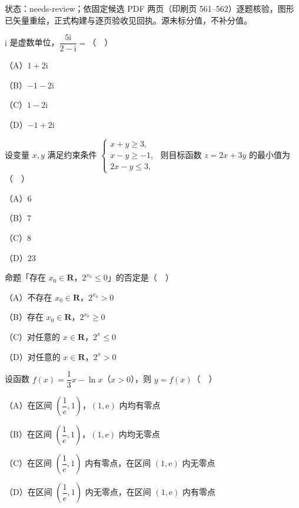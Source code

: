 

状态：needs-review；依固定候选 PDF 两页（印刷页 561–562）逐题核验，图形已矢量重绘，正式构建与逐页验收见回执。源未标分值，不补分值。


\begin{question}
$\mathrm i$ 是虚数单位，$\dfrac{5\mathrm i}{2-\mathrm i}=$（　）

（A）$1+2\mathrm i$

（B）$-1-2\mathrm i$

（C）$1-2\mathrm i$

（D）$-1+2\mathrm i$

\end{question}
\begin{question}
设变量 $x,y$ 满足约束条件 $\begin{cases}x+y\geqslant3,\\ x-y\geqslant-1,\\ 2x-y\leqslant3,\end{cases}$ 则目标函数 $z=2x+3y$ 的最小值为（　）

（A）$6$

（B）$7$

（C）$8$

（D）$23$

\end{question}
\begin{question}
命题「存在 $x_0\in\mathbf R$，$2^{x_0}\leqslant0$」的否定是（　）

（A）不存在 $x_0\in\mathbf R$，$2^{x_0}>0$

（B）存在 $x_0\in\mathbf R$，$2^{x_0}\geqslant0$

（C）对任意的 $x\in\mathbf R$，$2^x\leqslant0$

（D）对任意的 $x\in\mathbf R$，$2^x>0$

\end{question}
\begin{question}
设函数 $f(x)=\dfrac13x-\ln x$（$x>0$），则 $y=f(x)$（　）

（A）在区间 $\left(\dfrac1e,1\right)$，$(1,\mathrm e)$ 内均有零点

（B）在区间 $\left(\dfrac1e,1\right)$，$(1,\mathrm e)$ 内均无零点

（C）在区间 $\left(\dfrac1e,1\right)$ 内有零点，在区间 $(1,\mathrm e)$ 内无零点

（D）在区间 $\left(\dfrac1e,1\right)$ 内无零点，在区间 $(1,\mathrm e)$ 内有零点

\Needspace{0.4\textheight}
\end{question}
